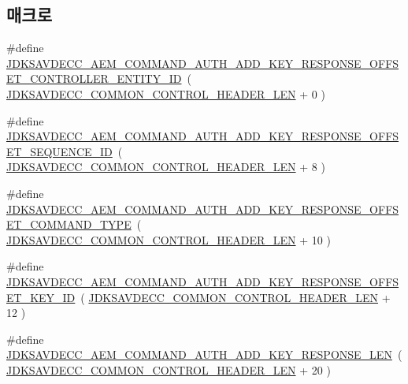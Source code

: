 \subsection*{매크로}
\begin{DoxyCompactItemize}
\item 
\#define \hyperlink{group__command__auth__add__key__response_gaf43033ba7c4319d2dbe68f097eaf79d3}{J\+D\+K\+S\+A\+V\+D\+E\+C\+C\+\_\+\+A\+E\+M\+\_\+\+C\+O\+M\+M\+A\+N\+D\+\_\+\+A\+U\+T\+H\+\_\+\+A\+D\+D\+\_\+\+K\+E\+Y\+\_\+\+R\+E\+S\+P\+O\+N\+S\+E\+\_\+\+O\+F\+F\+S\+E\+T\+\_\+\+C\+O\+N\+T\+R\+O\+L\+L\+E\+R\+\_\+\+E\+N\+T\+I\+T\+Y\+\_\+\+ID}~( \hyperlink{group__jdksavdecc__avtp__common__control__header_gaae84052886fb1bb42f3bc5f85b741dff}{J\+D\+K\+S\+A\+V\+D\+E\+C\+C\+\_\+\+C\+O\+M\+M\+O\+N\+\_\+\+C\+O\+N\+T\+R\+O\+L\+\_\+\+H\+E\+A\+D\+E\+R\+\_\+\+L\+EN} + 0 )
\item 
\#define \hyperlink{group__command__auth__add__key__response_ga5d0c6fa3ce14f6a20ef9b9f5b1936982}{J\+D\+K\+S\+A\+V\+D\+E\+C\+C\+\_\+\+A\+E\+M\+\_\+\+C\+O\+M\+M\+A\+N\+D\+\_\+\+A\+U\+T\+H\+\_\+\+A\+D\+D\+\_\+\+K\+E\+Y\+\_\+\+R\+E\+S\+P\+O\+N\+S\+E\+\_\+\+O\+F\+F\+S\+E\+T\+\_\+\+S\+E\+Q\+U\+E\+N\+C\+E\+\_\+\+ID}~( \hyperlink{group__jdksavdecc__avtp__common__control__header_gaae84052886fb1bb42f3bc5f85b741dff}{J\+D\+K\+S\+A\+V\+D\+E\+C\+C\+\_\+\+C\+O\+M\+M\+O\+N\+\_\+\+C\+O\+N\+T\+R\+O\+L\+\_\+\+H\+E\+A\+D\+E\+R\+\_\+\+L\+EN} + 8 )
\item 
\#define \hyperlink{group__command__auth__add__key__response_gabaf7fb59b41ef110f97ad444d26ced38}{J\+D\+K\+S\+A\+V\+D\+E\+C\+C\+\_\+\+A\+E\+M\+\_\+\+C\+O\+M\+M\+A\+N\+D\+\_\+\+A\+U\+T\+H\+\_\+\+A\+D\+D\+\_\+\+K\+E\+Y\+\_\+\+R\+E\+S\+P\+O\+N\+S\+E\+\_\+\+O\+F\+F\+S\+E\+T\+\_\+\+C\+O\+M\+M\+A\+N\+D\+\_\+\+T\+Y\+PE}~( \hyperlink{group__jdksavdecc__avtp__common__control__header_gaae84052886fb1bb42f3bc5f85b741dff}{J\+D\+K\+S\+A\+V\+D\+E\+C\+C\+\_\+\+C\+O\+M\+M\+O\+N\+\_\+\+C\+O\+N\+T\+R\+O\+L\+\_\+\+H\+E\+A\+D\+E\+R\+\_\+\+L\+EN} + 10 )
\item 
\#define \hyperlink{group__command__auth__add__key__response_gac659701eafa4fb41ca4aebf9efa2c61d}{J\+D\+K\+S\+A\+V\+D\+E\+C\+C\+\_\+\+A\+E\+M\+\_\+\+C\+O\+M\+M\+A\+N\+D\+\_\+\+A\+U\+T\+H\+\_\+\+A\+D\+D\+\_\+\+K\+E\+Y\+\_\+\+R\+E\+S\+P\+O\+N\+S\+E\+\_\+\+O\+F\+F\+S\+E\+T\+\_\+\+K\+E\+Y\+\_\+\+ID}~( \hyperlink{group__jdksavdecc__avtp__common__control__header_gaae84052886fb1bb42f3bc5f85b741dff}{J\+D\+K\+S\+A\+V\+D\+E\+C\+C\+\_\+\+C\+O\+M\+M\+O\+N\+\_\+\+C\+O\+N\+T\+R\+O\+L\+\_\+\+H\+E\+A\+D\+E\+R\+\_\+\+L\+EN} + 12 )
\item 
\#define \hyperlink{group__command__auth__add__key__response_gaf34e602f9d3603301ce41c98ca1e233b}{J\+D\+K\+S\+A\+V\+D\+E\+C\+C\+\_\+\+A\+E\+M\+\_\+\+C\+O\+M\+M\+A\+N\+D\+\_\+\+A\+U\+T\+H\+\_\+\+A\+D\+D\+\_\+\+K\+E\+Y\+\_\+\+R\+E\+S\+P\+O\+N\+S\+E\+\_\+\+L\+EN}~( \hyperlink{group__jdksavdecc__avtp__common__control__header_gaae84052886fb1bb42f3bc5f85b741dff}{J\+D\+K\+S\+A\+V\+D\+E\+C\+C\+\_\+\+C\+O\+M\+M\+O\+N\+\_\+\+C\+O\+N\+T\+R\+O\+L\+\_\+\+H\+E\+A\+D\+E\+R\+\_\+\+L\+EN} + 20 )
\end{DoxyCompactItemize}
